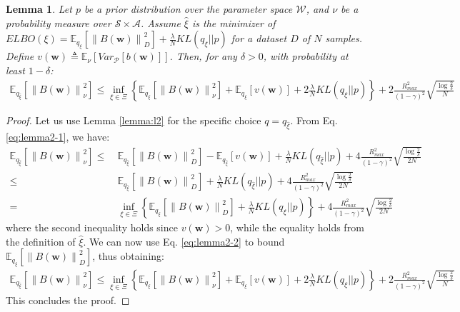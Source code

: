 \documentclass{article}
\newtheorem{lemma}{Lemma}
\newcommand{\wh}[1]{\widehat{#1}}
\newcommand{\norm}[1]{\left\lVert #1 \right\rVert}
\begin{document}
\begin{lemma}
Let $p$ be a prior distribution over the parameter space $\mathcal{W}$, and $\nu$ be a probability measure over $\mathcal{S}\times\mathcal{A}$. Assume $\wh{\xi}$ is the minimizer of $ELBO(\xi) = \mathbb{E}_{q_{\xi}}\left[ \norm{B(\bm{w})}_D^2 \right] + \frac{\lambda}{N} KL({q_{\xi}}||p)$ for a dataset $D$ of $N$ samples. Define $v(\bm{w}) \triangleq \mathbb{E}_{\nu}\left[Var_{\mathcal{P}}\left[b(\bm{w})\right]\right]$. Then, for any $\delta > 0$, with probability at least $1-\delta$:
\begin{align*}
\mathbb{E}_{q_{\wh{\xi}}}\left[ \norm{B(\bm{w})}_{\nu}^2 \right ] \leq \inf_{\xi \in \Xi}\left\{ \mathbb{E}_{q_{\xi}}\left[ \norm{B(\bm{w})}_{\nu}^2 \right ] + \mathbb{E}_{q_{\xi}}\left[ v(\bm{w}) \right] + 2\frac{\lambda}{N} KL({q_{\xi}}||p) \right\} + 2\frac{R_{max}^2}{(1-\gamma)^2}\sqrt{\frac{\log\frac{2}{\delta}}{N}}
\end{align*}
\end{lemma}
\begin{proof}
Let us use Lemma \ref{lemma:l2} for the specific choice $q=q_{\wh{\xi}}$. From Eq. \eqref{eq:lemma2-1}, we have:
\begin{align*}
\mathbb{E}_{q_{\wh{\xi}}}\left[ \norm{B(\bm{w})}_{\nu}^2 \right ] \leq\ & \mathbb{E}_{q_{\wh{\xi}}}\left[ \norm{B(\bm{w})}_D^2 \right] - \mathbb{E}_{q_{\wh{\xi}}}\left[ v(\bm{w}) \right] + \frac{\lambda}{N} KL({q_{\wh{\xi}}}||p) + 4\frac{R_{max}^2}{(1-\gamma)^2}\sqrt{\frac{\log\frac{2}{\delta}}{2N}}\\ \leq\ & \mathbb{E}_{q_{\wh{\xi}}}\left[ \norm{B(\bm{w})}_D^2 \right] + \frac{\lambda}{N} KL({q_{\wh{\xi}}}||p) + 4\frac{R_{max}^2}{(1-\gamma)^2}\sqrt{\frac{\log\frac{2}{\delta}}{2N}}\\ =\ & \inf_{\xi \in \Xi}\left\{ \mathbb{E}_{q_{\xi}}\left[ \norm{B(\bm{w})}_D^2 \right] + \frac{\lambda}{N} KL({q_{\xi}}||p) \right\} + 4\frac{R_{max}^2}{(1-\gamma)^2}\sqrt{\frac{\log\frac{2}{\delta}}{2N}}
\end{align*}
where the second inequality holds since $v(\bm{w}) > 0$, while the equality holds from the definition of $\wh{\xi}$. We can now use Eq. \eqref{eq:lemma2-2} to bound $\mathbb{E}_{q_{\xi}}\left[ \norm{B(\bm{w})}_D^2 \right]$, thus obtaining:
\begin{align*}
\mathbb{E}_{q_{\wh{\xi}}}\left[ \norm{B(\bm{w})}_{\nu}^2 \right ] \leq \inf_{\xi \in \Xi}\left\{ \mathbb{E}_{q_{\xi}}\left[ \norm{B(\bm{w})}_{\nu}^2 \right ] + \mathbb{E}_{q_{\xi}}\left[ v(\bm{w}) \right] + 2\frac{\lambda}{N} KL({q_{\xi}}||p) \right\} + 2\frac{R_{max}^2}{(1-\gamma)^2}\sqrt{\frac{\log\frac{2}{\delta}}{N}}
\end{align*}
This concludes the proof.
\end{proof}
\end{document}
